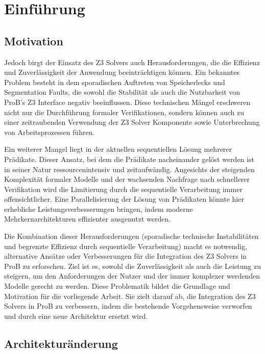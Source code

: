 


\section{Einführung}



\subsection{Motivation}


Jedoch birgt der Einsatz des Z3 Solvers auch Herausforderungen, die die Effizienz und Zuverlässigkeit der Anwendung beeinträchtigen können.
Ein bekanntes Problem besteht in dem sporadischen Auftreten von Speicherlecks und Segmentation Faults,
die sowohl die Stabilität als auch die Nutzbarkeit von ProB's Z3 Interface negativ beeinflussen.
Diese technischen Mängel erschweren nicht nur die Durchführung formaler Verifikationen,
sondern können auch zu einer zeitraubenden Verwendung der Z3 Solver Komponente sowie Unterbrechung von Arbeitsprozessen führen.

Ein weiterer Mangel liegt in der aktuellen sequentiellen Lösung mehrerer Prädikate.
Dieser Ansatz, bei dem die Prädikate nacheinander gelöst werden
ist in seiner Natur ressourcenintensiv und zeitaufwändig.
Angesichts der steigenden Komplexität formaler Modelle und der wachsenden Nachfrage nach schnellerer Verifikation wird die Limitierung durch die sequentielle Verarbeitung immer offensichtlicher.
Eine Parallelisierung der Lösung von Prädikaten könnte hier erhebliche Leistungsverbesserungen bringen,
indem moderne Mehrkernarchitekturen effizienter ausgenutzt werden.

Die Kombination dieser Herausforderungen (sporadische technische Instabilitäten und begrenzte Effizienz durch sequentielle Verarbeitung) macht es notwendig,
alternative Ansätze oder Verbesserungen für die Integration des Z3 Solvers in ProB zu erforschen.
Ziel ist es, sowohl die Zuverlässigkeit als auch die Leistung zu steigern,
um den Anforderungen der Nutzer und der immer komplexer werdenden Modelle gerecht zu werden.
Diese Problematik bildet die Grundlage und Motivation für die vorliegende Arbeit.
Sie zielt darauf ab, die Integration des Z3 Solvers in ProB zu verbessern,
indem die bestehende Vorgehensweise verworfen und durch eine neue Architektur ersetzt wird.


\subsection{Architekturänderung}

